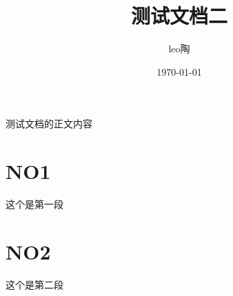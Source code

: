 \documentclass[UTF8]{ctexart}
\title{测试文档二}
\author{leo陶}
\date{\today}
\begin{document}
\maketitle


测试文档的正文内容
\section{NO1}
这个是第一段\cite{2011genome-wideassociationstudyidentifiestwosusceptibilitylociforexudativeage-relatedmaculardegenerationinthejapanesepopulation}
\cite{2012geneticstudiesofage-relatedmaculardegeneration:lessonschallengesandopportunitiesfordiseasemanagement}
\cite{Meng2015}
\cite{2011commonvariantsnearfrk/col10a1andvegfaareassociatedwithadvancedage-relatedmaculardegeneration}


\section{NO2}
这个是第二段\cite{identification_il6r_chromosome_11q135-lancet-2011}
\cite{2015rad51paralogsremodelpre-synapticrad51filamentstostimulatehomologousrecombination}


\end{document}
